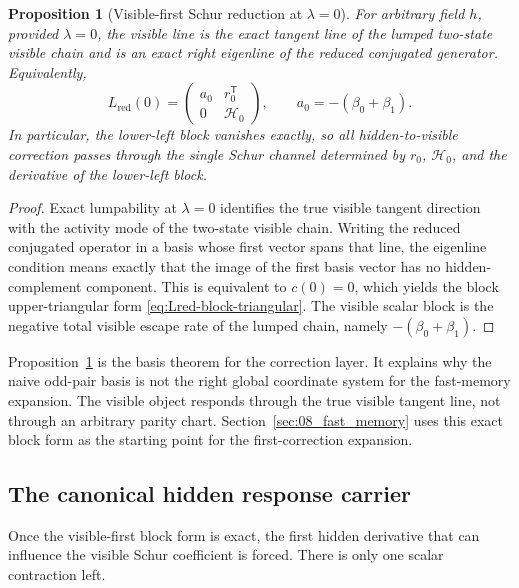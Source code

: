 \documentclass[11pt]{article}
\numberwithin{equation}{section}
\theoremstyle{thmcompact}
\newtheorem{proposition}[theorem]{Proposition}
\theoremstyle{remark}
\begin{document}
\begin{proposition}[Visible-first Schur reduction at $\lambda=0$]\label{prop:visible-first-schur}
For arbitrary field $h$, provided $\lambda=0$, the visible line is the exact tangent line of the lumped two-state visible chain and is an exact right eigenline of the reduced conjugated generator. Equivalently,
\begin{equation}\label{eq:Lred-block-triangular}
L_{\mathrm{red}}(0)=
\begin{pmatrix}
a_0 & r_0^{\mathsf T}\\
0 & \mathcal H_0
\end{pmatrix},
\qquad
a_0 = -(\beta_0+\beta_1).
\end{equation}
In particular, the lower-left block vanishes exactly, so all hidden-to-visible correction passes through the single Schur channel determined by $r_0$, $\mathcal H_0$, and the derivative of the lower-left block.
\end{proposition}

\begin{proof}
Exact lumpability at $\lambda=0$ identifies the true visible tangent direction with the activity mode of the two-state visible chain. Writing the reduced conjugated operator in a basis whose first vector spans that line, the eigenline condition means exactly that the image of the first basis vector has no hidden-complement component. This is equivalent to $c(0)=0$, which yields the block upper-triangular form \eqref{eq:Lred-block-triangular}. The visible scalar block is the negative total visible escape rate of the lumped chain, namely $-(\beta_0+\beta_1)$.
\end{proof}

Proposition~\ref{prop:visible-first-schur} is the basis theorem for the correction layer. It explains why the naive odd-pair basis is not the right global coordinate system for the fast-memory expansion. The visible object responds through the true visible tangent line, not through an arbitrary parity chart. Section~\ref{sec:08_fast_memory} uses this exact block form as the starting point for the first-correction expansion.

\subsection{The canonical hidden response carrier}

Once the visible-first block form is exact, the first hidden derivative that can influence the visible Schur coefficient is forced. There is only one scalar contraction left.
\end{document}
